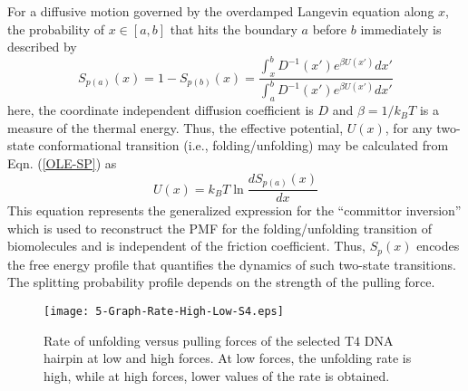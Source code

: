 \documentclass[twoside,twocolumn,9pt]{article}
\begin{document}
For a diffusive motion governed by the overdamped Langevin equation along $x$, the probability of $x\in[a,b]$ 
that hits the boundary $a$ before $b$ immediately is described by
\cite{makarov2021barrier,berezhkovskii2020nonequilibrium,covino2019molecular,manuel2015reconstructing,chodera2011splitting}
\begin{equation}
S_{p(a)}(x)=1-S_{p(b)}(x)=\frac{\int_{x}^{b}D^{-1}(x')e^{\beta U(x')}dx'}{\int_{a}^{b}D^{-1}(x')e^{\beta U(x')}dx'}
\label{OLE-SP}
\end{equation}
here, the coordinate independent diffusion coefficient is $D$ and $\beta=1/k_{B}T$ is a measure of the
thermal energy. Thus, the effective potential, $U(x)$, for any two-state conformational transition 
(i.e., folding/unfolding) may be calculated from Eqn. (\ref{OLE-SP}) as 
\begin{equation}
U(x)=k_{B}T \ln \frac{dS_{p(a)}(x)}{dx}
\label{generalized-PDF}
\end{equation} 
This equation represents the generalized expression for the ``committor inversion'' which is used to 
reconstruct the PMF for the folding/unfolding transition of biomolecules and is independent of the 
friction coefficient. Thus, $S_p(x)$ encodes the free energy profile that quantifies the dynamics of 
such two-state transitions. The splitting probability profile depends on the strength of the pulling force.

\begin{figure}[t!]
\texttt{[image: 5-Graph-Rate-High-Low-S4.eps]}
\caption{Rate of unfolding versus pulling forces of the selected T$4$ DNA hairpin at low and 
high forces. At low forces, the unfolding rate is high, while at high forces, lower values of the rate is obtained.} 
\label{Rate-High-Low}
\end{figure}
\end{document}
